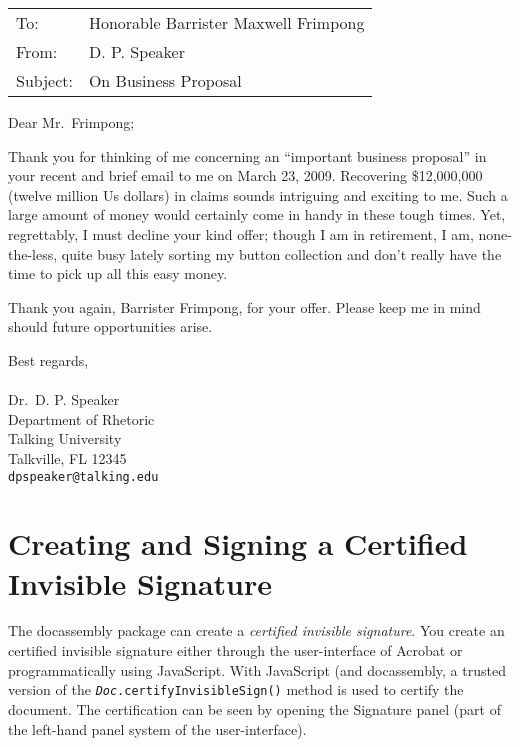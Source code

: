\documentclass[12pt]{article}
\begin{document}

\hfill\smash{\raisebox{-\baselineskip}{March 23, 2009}}

\begin{tabular}{@{}ll}
To:         &Honorable Barrister Maxwell Frimpong\\
From:       &D. P. Speaker\\
Subject:    &On Business Proposal\\
\end{tabular}

\vspace{2\baselineskip}

Dear Mr.\ Frimpong;

Thank you for thinking of me concerning an ``important business proposal'' in
your recent and brief email to me on March 23, 2009. Recovering \$12,000,000
(twelve million  Us dollars) in claims sounds intriguing and exciting to me.
Such a large amount of money would certainly come in handy in these tough
times. Yet, regrettably, I must decline your kind offer; though I am in
retirement, I am, none-the-less, quite busy lately sorting my button
collection and don't really have the time to pick up all this easy money.

Thank you again, Barrister Frimpong, for your offer. Please keep me
in mind should future opportunities arise.


\vspace{2\baselineskip}

Best regards,\\
\\[3pt]
Dr.\ D. P. Speaker\\
Department of Rhetoric\\
Talking University\\
Talkville, FL 12345\\
\texttt{dpspeaker@talking.edu}

\newpage

\section{Creating and Signing a Certified Invisible Signature}

The \textsf{docassembly} package can create a \emph{certified invisible
signature}. You create an certified invisible signature either through the
user-interface of \textsf{Acrobat} or programmatically using JavaScript. With
JavaScript (and \textsf{docassembly}, a trusted version of the
\texttt{\textsl{Doc}.certifyInvisibleSign()} method is used to certify the
document. The certification can be seen by opening the Signature panel
(part of the left-hand panel system of the user-interface).
\end{document}
